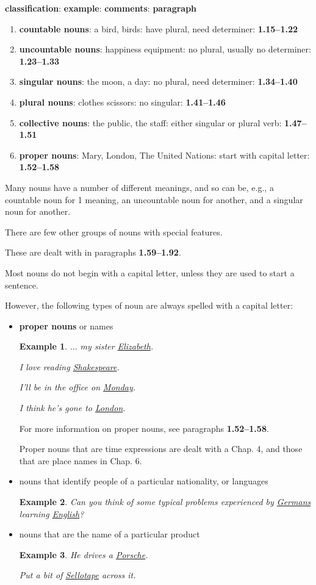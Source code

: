 \documentclass[oneside]{book}
\numberwithin{equation}{section}
\newtheorem{example}{Example}[section]
\begin{document}
\textbf{classification}: \textbf{example}: \textbf{comments}: \textbf{paragraph}
\begin{enumerate}
    \item \textbf{countable nouns}: a bird, birds: have plural, need determiner: \textbf{1.15--1.22}
    \item \textbf{uncountable nouns}: happiness equipment: no plural, usually no determiner: \textbf{1.23--1.33}
    \item \textbf{singular nouns}: the moon, a day: no plural, need determiner: \textbf{1.34--1.40}
    \item \textbf{plural nouns}: clothes scissors: no singular: \textbf{1.41--1.46}
    \item \textbf{collective nouns}: the public, the staff: either singular or plural verb: \textbf{1.47--1.51}
    \item \textbf{proper nouns}: Mary, London, The United Nations: start with capital letter: \textbf{1.52--1.58}
\end{enumerate}
Many nouns have a number of different meanings, and so can be, e.g., a countable noun for 1 meaning, an uncountable noun for another, and a singular noun for another.

%
There are few other groups of nouns with special features.

These are dealt with in paragraphs \textbf{1.59--1.92}.

%
\noindent{} Most nouns do not begin with a capital letter, unless they are used to start a sentence.

However, the following types of noun are always spelled with a capital letter:
\begin{itemize}
    \item \textbf{proper nouns} or names
    \begin{example}
        $\ldots$ my sister \underline{Elizabeth}.
        
        I love reading \underline{Shakespeare}.
        
        I'll be in the office on \underline{Monday}.
        
        I think he's gone to \underline{London}.
    \end{example}
    For more information on proper nouns, see paragraphs \textbf{1.52--1.58}.
    
    Proper nouns that are time expressions are dealt with a Chap. 4, and those that are place names in Chap. 6.
    \item nouns that identify people of a particular nationality, or languages
    \begin{example}
        Can you think of some typical problems experienced by \underline{Germans} learning \underline{English}?
    \end{example}
    \item nouns that are the name of a particular product
    \begin{example}
        He drives a \underline{Porsche}.
        
        Put a bit of \underline{Sellotape} across it.
    \end{example}
\end{itemize}
\end{document}
